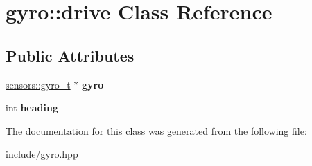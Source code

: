\hypertarget{classgyro_1_1drive}{}\section{gyro\+:\+:drive Class Reference}
\label{classgyro_1_1drive}
\subsection*{Public Attributes}
\begin{DoxyCompactItemize}
\item 
\mbox{\label{classgyro_1_1drive_a5b4064dc01de0802b7f6d3036885091a}} 
\hyperlink{classsensors_1_1gyro__t}{sensors\+::gyro\+\_\+t} $\ast$ {\bfseries gyro}
\item 
\mbox{\label{classgyro_1_1drive_a76152598da7454dc162b95c1e8b6156e}} 
int {\bfseries heading}
\end{DoxyCompactItemize}


The documentation for this class was generated from the following file\+:\begin{DoxyCompactItemize}
\item 
include/gyro.\+hpp\end{DoxyCompactItemize}
